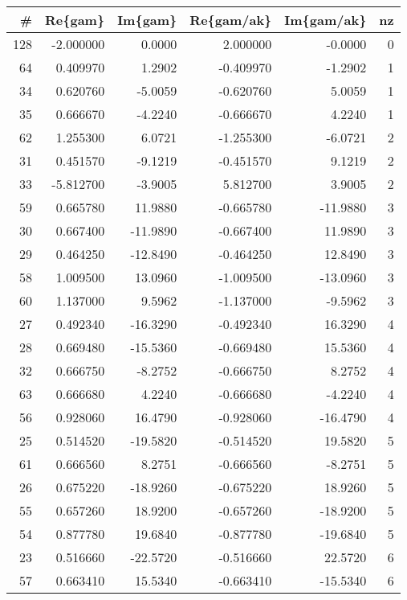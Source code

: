 \small \begin{tabular}{rrrrrr}
\toprule
  \# &   Re\{gam\} &  Im\{gam\} &  Re\{gam/ak\} &  Im\{gam/ak\} &  nz \\
\midrule
128 & -2.000000 &   0.0000 &    2.000000 &     -0.0000 &   0 \\
 64 &  0.409970 &   1.2902 &   -0.409970 &     -1.2902 &   1 \\
 34 &  0.620760 &  -5.0059 &   -0.620760 &      5.0059 &   1 \\
 35 &  0.666670 &  -4.2240 &   -0.666670 &      4.2240 &   1 \\
 62 &  1.255300 &   6.0721 &   -1.255300 &     -6.0721 &   2 \\
 31 &  0.451570 &  -9.1219 &   -0.451570 &      9.1219 &   2 \\
 33 & -5.812700 &  -3.9005 &    5.812700 &      3.9005 &   2 \\
 59 &  0.665780 &  11.9880 &   -0.665780 &    -11.9880 &   3 \\
 30 &  0.667400 & -11.9890 &   -0.667400 &     11.9890 &   3 \\
 29 &  0.464250 & -12.8490 &   -0.464250 &     12.8490 &   3 \\
 58 &  1.009500 &  13.0960 &   -1.009500 &    -13.0960 &   3 \\
 60 &  1.137000 &   9.5962 &   -1.137000 &     -9.5962 &   3 \\
 27 &  0.492340 & -16.3290 &   -0.492340 &     16.3290 &   4 \\
 28 &  0.669480 & -15.5360 &   -0.669480 &     15.5360 &   4 \\
 32 &  0.666750 &  -8.2752 &   -0.666750 &      8.2752 &   4 \\
 63 &  0.666680 &   4.2240 &   -0.666680 &     -4.2240 &   4 \\
 56 &  0.928060 &  16.4790 &   -0.928060 &    -16.4790 &   4 \\
 25 &  0.514520 & -19.5820 &   -0.514520 &     19.5820 &   5 \\
 61 &  0.666560 &   8.2751 &   -0.666560 &     -8.2751 &   5 \\
 26 &  0.675220 & -18.9260 &   -0.675220 &     18.9260 &   5 \\
 55 &  0.657260 &  18.9200 &   -0.657260 &    -18.9200 &   5 \\
 54 &  0.877780 &  19.6840 &   -0.877780 &    -19.6840 &   5 \\
 23 &  0.516660 & -22.5720 &   -0.516660 &     22.5720 &   6 \\
 57 &  0.663410 &  15.5340 &   -0.663410 &    -15.5340 &   6 \\

\end{tabular}
